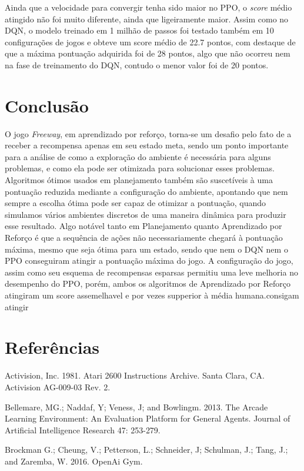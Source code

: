 \documentclass[letterpaper]{article} %
\begin{document}
Ainda que a velocidade para convergir tenha sido maior no PPO, o \textit{score} médio atingido não foi muito diferente, ainda que ligeiramente maior. Assim como no DQN, o modelo treinado em 1 milhão de passos foi testado também em 10 configurações de jogos e obteve um score médio de 22.7 pontos, com destaque de que a máxima pontuação adquirida foi de 28 pontos, algo que não ocorreu nem na fase de treinamento do DQN, contudo o menor valor foi de 20 pontos.


\section{Conclusão}
O jogo \textit{Freeway}, em aprendizado por reforço, torna-se um desafio pelo fato de a  receber a recompensa apenas em seu estado meta, sendo um ponto importante para a análise de como a exploração do ambiente é necessária para alguns problemas, e como ela pode ser otimizada para solucionar esses problemas. Algoritmos ótimos usados em planejamento também são suscetíveis à uma pontuação reduzida mediante a configuração do ambiente, apontando que nem sempre a escolha ótima pode ser capaz de otimizar a pontuação, quando simulamos vários ambientes discretos de uma maneira dinâmica para produzir esse resultado. Algo notável tanto em Planejamento quanto Aprendizado por Reforço é que a sequência de ações não necessariamente chegará à pontuação máxima, mesmo que seja ótima para um estado, sendo que nem o DQN nem o PPO conseguiram atingir a pontuação máxima do jogo. A configuração do jogo, assim como seu esquema de recompensas esparsas permitiu uma leve melhoria no desempenho do PPO, porém, ambos os algoritmos de Aprendizado por Reforço atingiram um score assemelhavel e por vezes supperior à média humana.consigam atingir


\section{Referências}
\smallskip \noindent
Activision, Inc. 1981. Atari 2600 Instructions Archive. Santa Clara, CA. Activision AG-009-03 Rev. 2.

\smallskip \noindent
Bellemare, MG.; Naddaf, Y; Veness, J; and Bowlingm. 2013. The Arcade Learning Environment: An Evaluation Platform for General Agents. Journal of Artificial Intelligence Research 47: 253-279.

\smallskip \noindent
Brockman G.; Cheung, V.; Petterson, L.; Schneider, J; Schulman, J.; Tang, J.; and Zaremba, W. 2016. OpenAi Gym.
\end{document}
